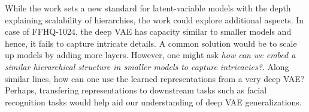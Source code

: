 \documentclass[11pt,letterpaper]{article}
\begin{document}
While the work sets a new standard for latent-variable models with the depth explaining scalability of hierarchies, the work could explore additional aspects. In case of FFHQ-1024, the deep VAE has capacity similar to smaller models and hence, it fails to capture intricate details. A common solution would be to scale up models by adding more layers. However, one might ask \textit{how can we embed a similar hierarchical structure in smaller models to capture intricacies?}. Along similar lines, how can one use the learned representations from a very deep VAE? Perhaps, transfering representations to downstream tasks such as facial recognition tasks would help aid our understanding of deep VAE generalizations. 
\end{document}
